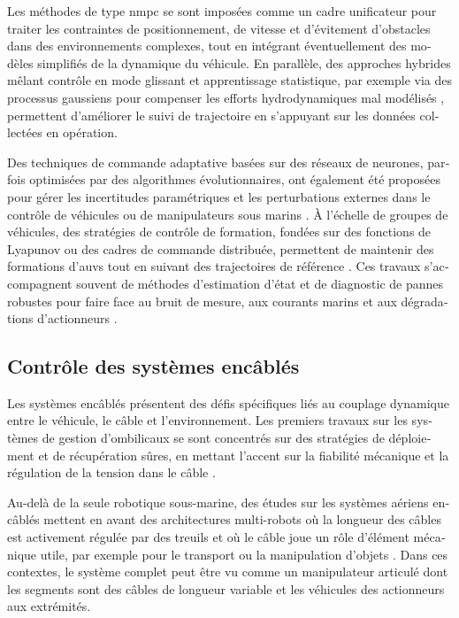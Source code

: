 \begin{otherlanguage}{french}
	Les méthodes de type \ac{nmpc} se sont imposées comme un cadre unificateur pour traiter les
	contraintes de positionnement, de vitesse et d'évitement d'obstacles dans des environnements
	complexes, tout en intégrant éventuellement des modèles simplifiés de la dynamique du véhicule. En
	parallèle, des approches hybrides mêlant contrôle en mode glissant et apprentissage statistique,
	par exemple via des processus gaussiens pour compenser les efforts hydrodynamiques mal modélisés
	\parencite{limaSlidingModeControl2020}, permettent d'améliorer le suivi de trajectoire en
	s'appuyant sur les données collectées en opération.

	Des techniques de commande adaptative basées sur des réseaux de neurones, parfois optimisées par
	des algorithmes évolutionnaires, ont également été proposées pour gérer les incertitudes
	paramétriques et les perturbations externes dans le contrôle de véhicules ou de manipulateurs sous
	marins \parencite{salloomAdaptiveNeuralNetwork2020}. À l'échelle de groupes de véhicules, des
	stratégies de contrôle de formation, fondées sur des fonctions de Lyapunov ou des cadres de
	commande distribuée, permettent de maintenir des formations d'\acp{auv} tout en suivant des
	trajectoires de référence \parencite{khalajiLyapunovBasedFormationControl2020}. Ces travaux
	s'accompagnent souvent de méthodes d'estimation d'état et de diagnostic de pannes robustes pour
	faire face au bruit de mesure, aux courants marins et aux dégradations d'actionneurs
	\parencite{songRobustStateEstimation2023}.

	\subsection{Contrôle des systèmes encâblés}
	\label{sif_sota_control_tethered}

	Les systèmes encâblés présentent des défis spécifiques liés au couplage dynamique entre le
	véhicule, le câble et l'environnement. Les premiers travaux sur les systèmes de gestion
	d'ombilicaux se sont concentrés sur des stratégies de déploiement et de récupération sûres, en
	mettant l'accent sur la fiabilité mécanique et la régulation de la tension dans le câble
	\parencite{abelUnderwaterVehicleTether1994,aaseModelingControlCatenary2018}.

	Au-delà de la seule robotique sous-marine, des études sur les systèmes aériens encâblés mettent en
	avant des architectures multi-robots où la longueur des câbles est activement régulée par des
	treuils et où le câble joue un rôle d'élément mécanique utile, par exemple pour le transport ou la
	manipulation d'objets
	\parencite{fagianoSystemsTetheredMulticopters2017,dantonioCatenaryRobotDesign2021}. Dans ces
	contextes, le système complet peut être vu comme un manipulateur articulé dont les segments sont
	des câbles de longueur variable et les véhicules des actionneurs aux extrémités.


\end{otherlanguage}

